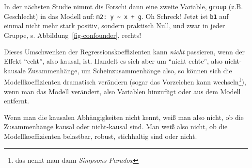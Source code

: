 \documentclass[
  a4paper,
]{scrbook}
\theoremstyle{definition}
\theoremstyle{definition}
\theoremstyle{definition}
\theoremstyle{remark}
\begin{document}
In der nächsten Studie nimmt dis Forschi dann eine zweite Variable,
\texttt{group} (z.B. Geschlecht) in das Modell auf:
\texttt{m2:\ y\ \textasciitilde{}\ x\ +\ g}. Oh Schreck! Jetzt ist
\texttt{b1} auf einmal nicht mehr stark positiv, sondern praktisch Null,
und zwar in jeder Gruppe, s. Abbildung~\ref{fig-confounder}, rechts!

Dieses Umschwenken der Regressionskoeffizienten kann \emph{nicht}
passieren, wenn der Effekt ``echt'', also kausal, ist. Handelt es sich
aber um ``nicht echte'', also nicht-kausale Zusammenhänge, um
Scheinzusammenhänge also, so können sich die Modellkoeffizienten
dramatisch verändern (sogar das Vorzeichen kann wechseln\footnote{das
  nennt man dann \emph{Simpsons Paradox}}), wenn man das Modell
verändert, also Variablen hinzufügt oder aus dem Modell entfernt.

Wenn man die kausalen Abhängigkeiten nicht kennt, weiß man also nicht,
ob die Zusammenhänge kausal oder nicht-kausal sind. Man weiß also nicht,
ob die Modellkoeffizienten belastbar, robust, stichhaltig sind oder
nicht.
\end{document}
